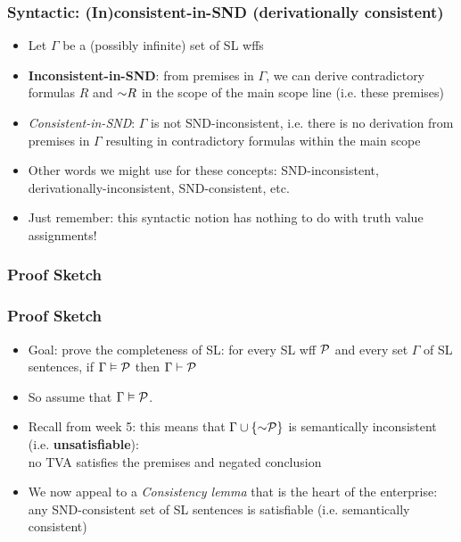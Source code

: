 \begin{frame}
\frametitle{Syntactic: (In)consistent-in-SND (derivationally consistent)}

\begin{itemize}[<+->]

\item Let $\Gamma$ be a (possibly infinite) set of SL wffs 

\item \textbf{\textcolor{OGlyallpink}{Inconsistent-in-SND}}: from premises in $\Gamma$, we can derive contradictory formulas $R$ and $\enot R$ in the scope of the main scope line (i.e. these premises)

\item \emph{Consistent-in-SND}: $\Gamma$ is not SND-inconsistent, i.e. there is no derivation from premises in $\Gamma$ resulting in contradictory formulas within the main scope

\item Other words we might use for these concepts: SND-inconsistent, derivationally-inconsistent, SND-consistent, etc.

\item Just remember: this syntactic notion has nothing to do with truth value assignments!

\end{itemize}
\end{frame}



\subsubsection{Proof Sketch}

\begin{frame}
\frametitle{Proof Sketch}

\begin{itemize}[<+->]

\item Goal: prove the completeness of SL: for every SL wff $\mathcal{P}$ and every set $\Gamma$ of SL sentences, if $\Gamma \vDash \mathcal{P}$ then $\Gamma \vdash \mathcal{P}$

\item So assume that $\Gamma \vDash \mathcal{P}$. 

\item Recall from week 5: this means that $\Gamma \cup \{\enot \metav{P}\}$ is semantically inconsistent (i.e. \textbf{\textcolor{OGlyallpink}{unsatisfiable}}): \\ no TVA satisfies the premises and negated conclusion  

\item We now appeal to a \emph{Consistency lemma} that is the heart of the enterprise: any SND-consistent set of SL sentences is satisfiable (i.e. semantically consistent)

\end{itemize}
\end{frame}

